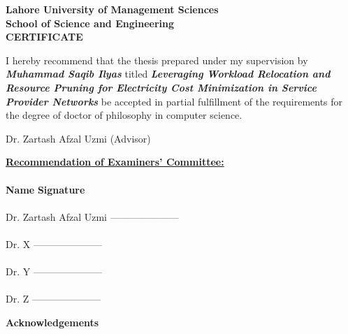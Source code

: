 \newpage
\thispagestyle{empty}
\begin{center}
  \vspace*{1cm}
\textbf{\Large Lahore University of Management Sciences}\\
\vspace*{1cm} \textbf{\large School of Science and
Engineering}\\\vspace*{1cm} \textbf{\large CERTIFICATE}
\end{center}
\vspace*{1cm}I hereby recommend that the thesis prepared under my
supervision by \textbf{\textit{Muhammad Saqib Ilyas}} titled
\textbf{\textit{Leveraging Workload Relocation and Resource Pruning for Electricity Cost Minimization in Service Provider Networks}} be accepted in partial fulfillment of the requirements for the degree of doctor of philosophy in computer science.
\begin{flushright}
Dr. Zartash Afzal Uzmi (Advisor) \end{flushright}
\textbf{\underline{Recommendation of Examiners' Committee:}}\\
\\\textbf{Name} \hspace*{6cm} \textbf{Signature}\\ \\
Dr. Zartash Afzal Uzmi \hspace*{1.7cm} {---------------------}\\\\
Dr. X \hspace*{1.7cm} {---------------------}\\\\
Dr. Y \hspace*{1.7cm} {---------------------}\\\\
Dr. Z\hspace*{1.7cm} {---------------------}

\newpage
\thispagestyle{empty}
\begin{center}
  \vspace*{1cm}
  \textbf{\large Acknowledgements}
\end{center}


